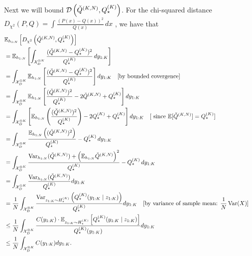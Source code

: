 Next we will bound $\mathcal{D}\left(\check{Q}^{(K,N)},Q^{(K)}_{\star}\right)$. 
For the chi-squared distance $D_{\chi^2}(P,Q) = \int \frac{(P(x) - Q(x))^2}{Q(x)} \, dx$ \citep{cover2006elements}, we have that
\begin{align}
\lefteqn{\mathbb{E}_{h_{1:N}} \left[ D_{\chi^2}\left( \check{Q}^{(K,N)}, Q^{(K)}_{\star} \right) \right]} \\
&= \mathbb{E}_{h_{1:N}} \left[ \int_{\mathcal{X}^{\otimes K}_{D}} \frac{(\check{Q}^{(K,N)} - Q^{(K)}_{\star})^2}{Q^{(K)}_{\star}} \, d y_{1:K} \right] \\
%
&= \int_{\mathcal{X}^{\otimes K}_{D}} \mathbb{E}_{h_{1:N}} \left[ \frac{(\check{Q}^{(K,N)} - Q^{(K)}_{\star})^2}{Q^{(K)}_{\star}} \right] d y_{1:K} 
\quad \text{[by bounded covergence]}\\
%
&= \int_{\mathcal{X}^{\otimes K}_{D}} \mathbb{E}_{h_{1:N}} \left[ \frac{(\check{Q}^{(K,N)})^2}{Q^{(K)}_{\star}} - 2\check{Q}^{(K,N)} + Q^{(K)}_{\star} \right] d y_{1:K} \\
%
&= \int_{\mathcal{X}^{\otimes K}_{D}} \left[ \mathbb{E}_{h_{1:N}} \left( \frac{(\check{Q}^{(K,N)})^2}{Q^{(K)}_{\star}} \right)
- 2Q^{(K)}_{\star} + Q^{(K)}_{\star} \right] d y_{1:K}
\quad \text{[ since } \mathbb{E}[\check{Q}^{(K,N)}] = Q^{(K)}_{\star} \text{]}\\
%
&= \int_{\mathcal{X}^{\otimes K}_{D}} \frac{ \mathbb{E}_{h_{1:N}} \left( (\check{Q}^{(K,N)})^2 \right) }{Q^{(K)}_{\star}} - Q^{(K)}_{\star}\, d y_{1:K} \\
%
&= \int_{\mathcal{X}^{\otimes K}_{D}} \frac{ \operatorname{Var}_{h_{1:N}}(\check{Q}^{(K,N)}) + \left( \mathbb{E}_{h_{1:N}} \check{Q}^{(K,N)} \right)^2 }{Q^{(K)}_{\star}}- Q^{(K)}_{\star} \, d y_{1:K} \\
%
&= \int_{\mathcal{X}^{\otimes K}_{D}} \frac{ \operatorname{Var}_{h_{1:N}}(\check{Q}^{(K,N)}) }{ Q^{(K)}_{\star} } d y_{1:K}\\
%
&= \frac{1}{N} \int_{\mathcal{X}^{\otimes K}_{D}} \frac{ \Var_{z_{1:K}\sim H^{(K)}_{\star}}\lrp{Q^{(K)}_{\star}({y}_{1:K}\mid z_{1:K})}}
{ Q^{(K)}_{\star} } d y_{1:K}
\quad \text{[by variance of sample mean: } \frac{1}{N} \operatorname{Var}(X) \text{]}\\
&\leq\frac{1}{N}\int_{\mathcal{X}^{\otimes K}_{D}}\frac
{C({y}_{1:K})\cdot\mathbb{E}_{z_{1:K}\sim H^{(K)}_{\star}}\lrb{Q^{(K)}_{\star}({y}_{1:K}\mid z_{1:K})}}
{Q^{(K)}_{\star}({y}_{1:K})}d{y}_{1:K} \\
&\leq\frac{1}{N}\int_{\mathcal{X}^{\otimes K}_{D}} C({y}_{1:K}) d{y}_{1:K}.
\end{align}
